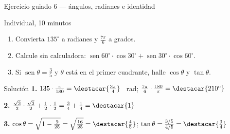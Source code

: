 \documentclass[aspectratio=169,10pt]{beamer}
\begin{document}
\begin{frame}{Ejercicio guiado 6 — ángulos, radianes e identidad}
  \scriptsize
  \begin{alertblock}{Individual, 10 minutos}
    \scriptsize
    \begin{enumerate}\setlength{\itemsep}{0.04cm}
      \item Convierta $135^{\circ}$ a radianes y $\frac{7\pi}{6}$ a grados.
      \item Calcule sin calculadora:
            $\operatorname{sen}60^{\circ}\cdot\cos 30^{\circ}
             + \operatorname{sen}30^{\circ}\cdot\cos 60^{\circ}$.
      \item Si $\operatorname{sen}\theta=\frac{3}{5}$ y $\theta$ está en el
            primer cuadrante, halle $\cos\theta$ y $\tan\theta$.
    \end{enumerate}
  \end{alertblock}

  \vspace{0.08cm}
  \begin{block}{Solución}
    \tiny
    \textbf{1.} $135\cdot\frac{\pi}{180}
    = \destacar{\frac{3\pi}{4}}$ \ rad; \quad
    $\frac{7\pi}{6}\cdot\frac{180}{\pi}
    = \destacar{210^{\circ}}$

    \vspace{0.08cm}
    \textbf{2.} $\frac{\sqrt{3}}{2}\cdot\frac{\sqrt{3}}{2}
    + \frac{1}{2}\cdot\frac{1}{2}
    = \frac{3}{4}+\frac{1}{4} = \destacar{1}$

    \vspace{0.08cm}
    \textbf{3.} $\cos\theta = \sqrt{1-\frac{9}{25}}
    = \sqrt{\frac{16}{25}} = \destacar{\frac{4}{5}}$; \quad
    $\tan\theta = \frac{3/5}{4/5} = \destacar{\frac{3}{4}}$
  \end{block}
\end{frame}

\end{document}
